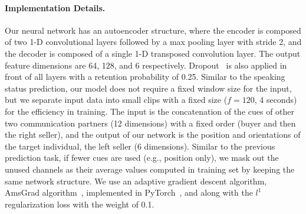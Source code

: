 \paragraph{Implementation Details.}
Our neural network has an autoencoder structure, where the encoder is composed of two 1-D convolutional layers followed by a max pooling layer with stride 2, and the decoder is composed of a single 1-D transposed convolution layer. The output feature dimensions are 64, 128, and 6 respectively. Dropout~\cite{srivastava2014dropout} is also applied in front of all layers with a retention probability of 0.25. Similar to the speaking status prediction, our model does not require a fixed window size for the input, but we separate input data into small clips with a fixed size ($f=120$, 4 seconds) for the efficiency in training. The input is the concatenation of the cues of other two communication partners (12 dimensions) with a fixed order (buyer and then the right seller), and the output of our network is the position and orientations of the target individual, the left seller (6 dimensions). Similar to the previous prediction task, if fewer cues are used (e.g., position only), we mask out the unused channels as their average values computed in training set by keeping the same network structure. We use an adaptive gradient descent algorithm, AmsGrad algorithm~\cite{reddi2018convergence}, implemented in PyTorch~\cite{paszke2017automatic}, and along with the $l^1$ regularization loss with the weight of 0.1.

